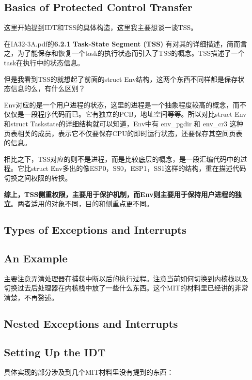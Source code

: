 \documentclass{article}
\newcommand{\highlight}[1]{{\bfseries \color{red}  #1}}
\begin{document}
\begin{CJK*}{UTF8}{gkai}
\subsection{Basics of Protected Control Transfer}

这里开始提到IDT和TSS的具体构造，这里我主要想谈一谈TSS。

在IA32-3A.pdf的{\ttfamily \bfseries 6.2.1 Task-State Segment (TSS) } 有对其的详细描述，简而言之，为了能保存和恢复一个task的执行状态而引入了TSS的概念。TSS描述了一个task在执行中的状态信息。

但是我看到TSS的就想起了前面的struct Env结构，这两个东西不同样都是保存状态信息的么，有什么区别？

Env对应的是一个用户进程的状态，这里的进程是一个抽象程度较高的概念，而不仅仅是一段程序代码而已。它有独立的PCB，地址空间等等。所以对比struct Env和struct Taskstate的详细结构就可以知道，Env中有 env\_pgdir 和 env\_cr3 这种页表相关的成员，表示它不仅要保存CPU的即时运行状态，还要保存其空间页表的信息。

相比之下，TSS对应的则不是进程，而是比较底层的概念，是一段汇编代码中的过程。它比struct Env多出的像ESP0，SS0，ESP1，SS1这样的结构，重在描述代码切换之间权限的转换。

\highlight{综上，TSS侧重权限，主要用于保护机制，而Env则主要用于保持用户进程的独立}。两者适用的对象不同，目的和侧重点更不同。


\subsection{Types of Exceptions and Interrupts}

\subsection{An Example}

主要注意弄清处理器在捕获中断以后的执行过程。注意当前如何切换到内核栈以及切换过去后处理器在内核栈中放了一些什么东西。这个MIT的材料里已经讲的非常清楚，不再赘述。

\subsection{Nested Exceptions and Interrupts}

\subsection{Setting Up the IDT}

具体实现的部分涉及到几个MIT材料里没有提到的东西：


\end{CJK*}
\end{document}
